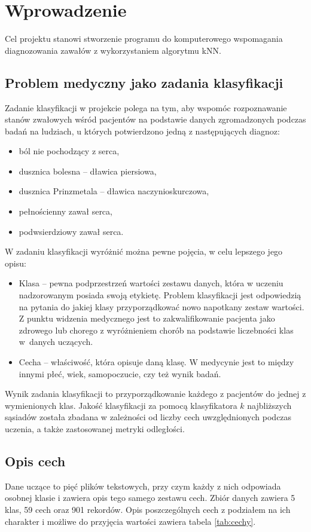 \section{Wprowadzenie}
Cel projektu stanowi stworzenie programu do komputerowego wspomagania diagnozowania zawałów z wykorzystaniem algorytmu kNN.

\subsection{Problem medyczny jako zadania klasyfikacji}
Zadanie klasyfikacji w projekcie polega na tym, aby wspomóc rozpoznawanie stanów zwałowych wśród pacjentów na podstawie danych zgromadzonych podczas badań na ludziach, u których potwierdzono jedną z następujących diagnoz:

\begin{itemize}
    \item ból nie pochodzący z serca,
    \item dusznica bolesna – dławica piersiowa,
    \item dusznica Prinzmetala – dławica naczynioskurczowa,
    \item pełnościenny zawał serca,
    \item podwsierdziowy zawał serca.
\end{itemize}

\noindent
W zadaniu klasyfikacji wyróżnić można pewne pojęcia, w celu lepszego jego opisu:

\begin{itemize}
    \item Klasa – pewna podprzestrzeń wartości zestawu danych, która w uczeniu nadzorowanym posiada swoją etykietę. Problem klasyfikacji jest odpowiedzią na pytania do jakiej klasy przyporządkować nowo napotkany zestaw wartości. Z punktu widzenia medycznego jest to zakwalifikowanie pacjenta jako zdrowego lub chorego z wyróżnieniem chorób na podstawie liczebności klas w~danych uczących.

    \item Cecha – właściwość, która opisuje daną klasę. W medycynie jest to między innymi płeć, wiek, samopoczucie, czy też wynik badań.
\end{itemize}

Wynik zadania klasyfikacji to przyporządkowanie każdego z pacjentów do jednej z wymienionych klas. Jakość klasyfikacji za pomocą klasyfikatora $k$ najbliższych sąsiadów została zbadana w zależności od liczby cech uwzględnionych podczas uczenia, a także zastosowanej metryki odległości.

\subsection{Opis cech}
Dane uczące to pięć plików tekstowych, przy czym każdy z nich odpowiada osobnej klasie i zawiera opis tego samego zestawu cech. Zbiór danych zawiera 5 klas, 59 cech oraz 901 rekordów. Opis poszczególnych cech z podziałem na ich charakter i możliwe do przyjęcia wartości zawiera tabela \ref{tab:cechy}.



